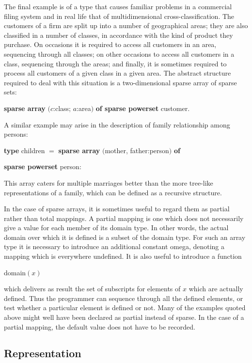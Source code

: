 The final example is of a type that causes familiar problems in a commercial filing system and in real life \textemdash{} that of multidimensional cross-classification. The customers of a firm are split up into a number of geographical areas; they are also classified in a number of classes, in accordance with the kind of product they purchase. On occasions it is required to access all customers in an area, sequencing through all classes; on other occasions to access all customers in a class, sequencing through the areas; and finally, it is sometimes required to process all customers of a given class in a given area. The abstract structure required to deal with this situation is a two-dimensional sparse array of sparse sets:

\quad \textbf{sparse array} $(c$:class; $a$:area$)$ \textbf{of sparse powerset} customer.

A similar example may arise in the description of family relationship among persons:

\quad \textbf{type} children $=$ \textbf{sparse array} $($mother, father:person$)$ \textbf{of} 

\tabto*{9.2em}\textbf{sparse powerset} person:

\noindent
This array caters for multiple marriages better than the more tree-like representations of a family, which can be defined as a recursive structure.

In the case of sparse arrays, it is sometimes useful to regard them as partial rather than total mappings. A partial mapping is one which does not necessarily give a value for each member of its domain type. In other words, the actual domain over which it is defined is a subset of the domain type. For such an array type it is necessary to introduce an additional constant omega, denoting a mapping which is everywhere undefined. It is also useful to introduce a function

\quad domain$(x)$

\noindent
which delivers as result the set of subscripts for elements of $x$ which are actually defined. Thus the programmer can sequence through all the defined elements, or test whether a particular element is defined or not. Many of the examples quoted above might well have been declared as partial instead of sparse. In the case of a partial mapping, the default value does not have to be recorded.

\subsection{Representation}

